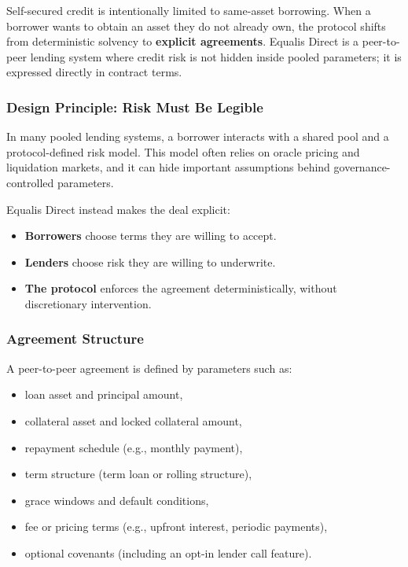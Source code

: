 \documentclass[version=preprint]{iacrcc}
\begin{document}
Self-secured credit is intentionally limited to same-asset borrowing. When a borrower wants to obtain an asset they do not already own, the protocol shifts from deterministic solvency to \textbf{explicit agreements}. Equalis Direct is a peer-to-peer lending system where credit risk is not hidden inside pooled parameters; it is expressed directly in contract terms.

\subsubsection{Design Principle: Risk Must Be Legible}

In many pooled lending systems, a borrower interacts with a shared pool and a protocol-defined risk model. This model often relies on oracle pricing and liquidation markets, and it can hide important assumptions behind governance-controlled parameters.

Equalis Direct instead makes the deal explicit:
\begin{itemize}
  \item \textbf{Borrowers} choose terms they are willing to accept.
  \item \textbf{Lenders} choose risk they are willing to underwrite.
  \item \textbf{The protocol} enforces the agreement deterministically, without discretionary intervention.
\end{itemize}

\subsubsection{Agreement Structure}

A peer-to-peer agreement is defined by parameters such as:
\begin{itemize}
  \item loan asset and principal amount,
  \item collateral asset and locked collateral amount,
  \item repayment schedule (e.g., monthly payment),
  \item term structure (term loan or rolling structure),
  \item grace windows and default conditions,
  \item fee or pricing terms (e.g., upfront interest, periodic payments),
  \item optional covenants (including an opt-in lender call feature).
\end{itemize}
\end{document}
